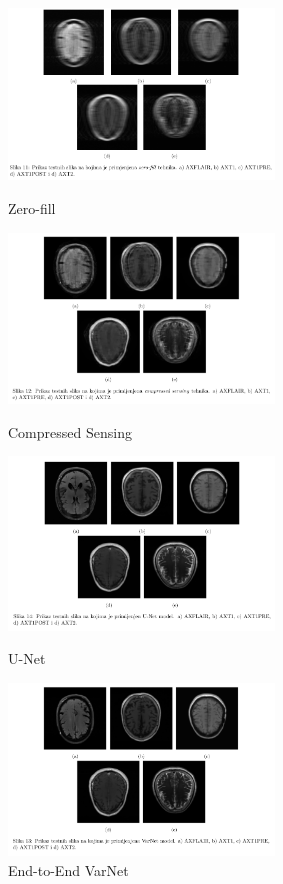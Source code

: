 \documentclass[10pt,a4paper]{article}
\begin{document}
\begin{figure}[H]
\centering
\begin{minipage}{.45\textwidth}
  \centering
  \includegraphics[width=200pt]{./images/zero-fill.png}
  \caption{Zero-fill}
\end{minipage}%
\hspace{20pt} %
\begin{minipage}{.45\textwidth}
  \centering
  \includegraphics[width=200pt]{./images/compressed-sensing-images.png}
  \caption{Compressed Sensing}
\end{minipage}

\vspace{20pt} %

\begin{minipage}{.45\textwidth}
  \centering
  \includegraphics[width=200pt]{./images/unet-images.png}
  \caption{U-Net}
\end{minipage}%
\hspace{20pt} %
\begin{minipage}{.45\textwidth}
  \centering
  \includegraphics[width=200pt]{./images/varnet-images.png}
  \caption{End-to-End VarNet}
\end{minipage}
\end{figure}
\end{document}
